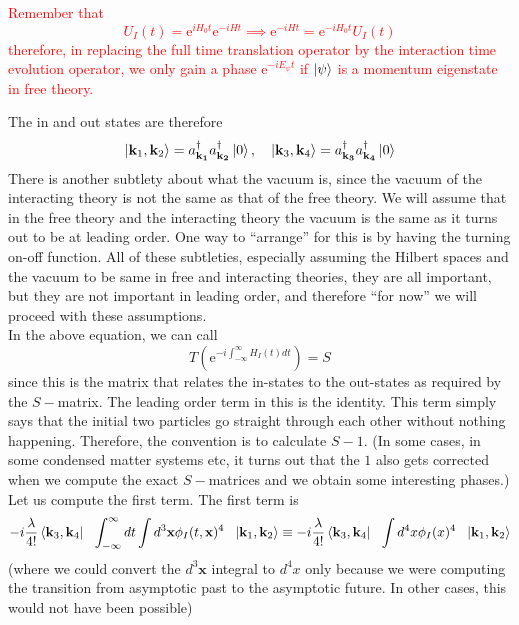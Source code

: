 \documentclass[11pt, notitlepage]{report}
\newcommand{\e}{\mathrm{e}}
\newcommand{\adag}[1]{a^\dagger_\mathbf{#1}}
\numberwithin{equation}{section}
\begin{document}
    \textcolor{red}{
    Remember that 
    \begin{equation*}
        U_I(t) = \e^{iH_0t }\e^{-iHt} \implies \e^{-iHt} = \e^{-iH_0t} U_I(t)
    \end{equation*}
    therefore, in replacing the full time translation operator by the interaction time evolution operator, we only gain a phase \(\e^{-iE_\psi t}\) if \(\ket{\psi}\) is a momentum eigenstate in free theory.\\
    }

    The in and out states are therefore 
    \begin{equation*}
        \ket{\textbf{k}_1, \textbf{k}_2} = \adag{k_1}\adag{k_2}\ket{0},~~~\ket{\textbf{k}_3, \textbf{k}_4} = \adag{k_3}\adag{k_4}\ket{0}
    \end{equation*}
    There is another subtlety about what the vacuum is, since the vacuum of the interacting theory is not the same as that of the free theory. We will assume that in the free theory and the interacting theory the vacuum is the same as it turns out to be at leading order. One way to ``arrange'' for this is by having the turning on-off function. All of these subtleties, especially assuming the Hilbert spaces and the vacuum to be same in free and interacting theories, they are all important, but they are not important in leading order, and therefore ``for now'' we will proceed with these assumptions.\\

    In the above equation, we can call 
    \begin{equation*}
        T\left(\e^{-i\int_{-\infty}^{\infty}H_I(t) dt }\right) = S
    \end{equation*}
    since this is the matrix that relates the in-states to the out-states as required by the \(S-\)matrix. The leading order term in this is the identity. This term simply says that the initial two particles go straight through each other without nothing happening. Therefore, the convention is to calculate \(S-1\). (In some cases, in some condensed matter systems etc, it turns out that the \(1\) also gets corrected when we compute the exact \(S-\)matrices and we obtain some interesting phases.)\\

    Let us compute the first term. The first term is 
    \begin{equation*}
        -i\frac{\lambda}{4!} \bra{\textbf{k}_3, \textbf{k}_4} ~~\int_{-\infty}^{\infty} dt \int d^3\textbf{x} \phi_I(t, \textbf{x})^4~~ \ket{\textbf{k}_1, \textbf{k}_2} \equiv -i\frac{\lambda}{4!} \bra{\textbf{k}_3, \textbf{k}_4} ~~ \int d^4x \phi_I(x)^4~~ \ket{\textbf{k}_1, \textbf{k}_2}
    \end{equation*}
    (where we could convert the \(d^3\textbf{x}\) integral to \(d^4x\) only because we were computing the transition from asymptotic past to the asymptotic future. In other cases, this would not have been possible)\\
\end{document}
